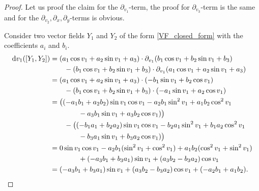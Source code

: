 \documentclass[10pt,a4paper]{amsart}
\newcommand{\di}{\mathrm{d}}
\begin{document}
\begin{proof}
    Let us proof the claim for the $\partial_{v_1}$-term, the proof for $\partial_{v_3}$-term is the same and for the $\partial_{v_2}, \partial_{x}, \partial_{y}$-terms is obvious.

    Consider two vector fields $Y_1$ and $Y_2$ of the form \eqref{VF_closed_form} with the  coefficients $a_i$ and $b_i$.
    \begin{align*}
        \di v_1 ([Y_1,Y_2])
        &= (a_1 \cos v_1 + a_2 \sin v_1 + a_3) \cdot \partial_{v_1}(b_1 \cos v_1 + b_2 \sin v_1 + b_3)\\
        &\qquad - (b_1 \cos v_1 + b_2 \sin v_1 + b_3) \cdot \partial_{v_1}(a_1 \cos v_1 + a_2 \sin v_1 + a_3)\\
        &= (a_1 \cos v_1 + a_2 \sin v_1 + a_3) \cdot (-b_1 \sin v_1 + b_2 \cos v_1)\\
        &\qquad - (b_1 \cos v_1 + b_2 \sin v_1 + b_3) \cdot (-a_1 \sin v_1 + a_2 \cos v_1)\\
        &= \bigl( (-a_1 b_1 + a_2 b_2) \sin v_1 \cos v_1 - a_2 b_1 \sin^2 v_1 + a_1 b_2 \cos^2 v_1\\
        &\qquad\qquad - a_3 b_1 \sin v_1 + a_3 b_2 \cos v_1) \bigr) \\
        &\qquad - \bigl( (-b_1 a_1 + b_2 a_2) \sin v_1 \cos v_1 - b_2 a_1 \sin^2 v_1 + b_1 a_2 \cos^2 v_1\\
        &\qquad\qquad - b_3 a_1 \sin v_1 + b_3 a_2 \cos v_1) \bigr) \\
        &= 0 \sin v_1 \cos v_1 - a_2 b_1 (\sin^2 v_1 + \cos^2 v_1) + a_1 b_2 (\cos^2 v_1 + \sin^2 v_1)\\
        &\qquad\qquad + (-a_3 b_1 + b_3 a_1) \sin v_1 + (a_3 b_2 - b_3 a_2) \cos v_1\\
        &= (-a_3 b_1 + b_3 a_1) \sin v_1 + (a_3 b_2 - b_3 a_2) \cos v_1 + (-a_2 b_1 + a_1 b_2).
        \qedhere
    \end{align*}
\end{proof}
\end{document}

